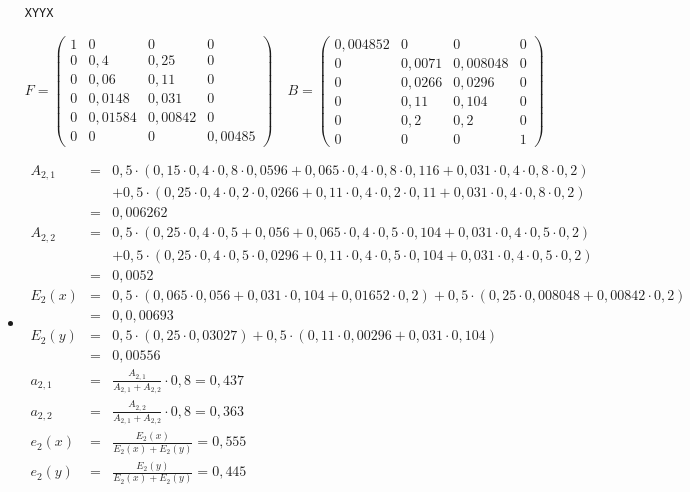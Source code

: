 \documentclass{homework}
\begin{document}
\begin{enumerate}
\begin{itemize}
\item[\texttt{XYYX}]

$$F = \begin{pmatrix}
1 & 0 & 0 & 0\\
0 & 0,4 & 0,25 & 0\\
0 & 0,06 & 0,11 & 0\\
0 & 0,0148 & 0,031 & 0\\
0 & 0,01584 & 0,00842 & 0\\
0 & 0 & 0 & 0,00485
\end{pmatrix}
\quad
B = \begin{pmatrix}
0,004852 & 0 & 0 & 0\\
0 & 0,0071 & 0,008048 & 0\\
0 & 0,0266 & 0,0296 & 0\\
0 & 0,11 & 0,104 & 0\\
0 & 0,2 & 0,2 & 0\\
0 & 0 & 0 & 1
\end{pmatrix}$$

\item

\begin{eqnarray*}
A_{2,1} & = & 0,5 \cdot (0,15 \cdot 0,4 \cdot 0,8 \cdot 0,0596 + 0,065 \cdot 0,4 \cdot 0,8 \cdot 0,116 + 0,031 \cdot 0,4 \cdot 0,8 \cdot 0,2)\\
&& + 0,5 \cdot (0,25 \cdot 0,4 \cdot 0,2 \cdot 0,0266 + 0,11 \cdot 0,4 \cdot 0,2 \cdot 0,11 + 0,031 \cdot 0,4 \cdot 0,8 \cdot 0,2)\\
& = & 0,006262\\
A_{2,2} & = & 0,5 \cdot (0,25 \cdot 0,4 \cdot 0,5 + 0,056 + 0,065 \cdot 0,4 \cdot 0,5 \cdot 0,104 + 0,031 \cdot 0,4 \cdot 0,5 \cdot 0,2)\\
&& + 0,5 \cdot (0,25 \cdot 0,4 \cdot 0,5 \cdot 0,0296 + 0,11 \cdot 0,4 \cdot 0,5 \cdot 0,104 + 0,031 \cdot 0,4 \cdot 0,5 \cdot 0,2)\\
& = & 0,0052\\
E_2(x) & = & 0,5 \cdot (0,065 \cdot 0,056 + 0,031 \cdot 0,104 + 0,01652 \cdot 0,2) + 0,5 \cdot (0,25 \cdot 0,008048 + 0,00842 \cdot 0,2)\\
& = & 0,0,00693\\
E_2(y) & = & 0,5 \cdot (0,25 \cdot 0,03027) + 0,5 \cdot (0,11 \cdot 0,00296 + 0,031 \cdot 0,104)\\
& = & 0,00556\\
a_{2,1} & = & \frac{A_{2,1}}{A_{2,1} + A_{2,2}} \cdot 0,8 = 0,437\\
a_{2,2} & = & \frac{A_{2,2}}{A_{2,1} + A_{2,2}} \cdot 0,8 = 0,363\\
e_2(x) & = & \frac{E_2(x)}{E_2(x) + E_2(y)} = 0,555\\
e_2(y) & = & \frac{E_2(y)}{E_2(x) + E_2(y)} = 0,445
\end{eqnarray*}


\end{itemize}
\end{enumerate}
\end{document}

